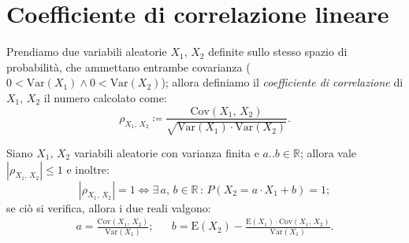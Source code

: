     \section{Coefficiente di correlazione lineare}
        \begin{defn}
            Prendiamo due variabili aleatorie $X_1,\,X_2$ definite sullo stesso spazio di probabilità, che ammettano entrambe covarianza ($0<\text{Var}(X_1) \land 0<\text{Var}(X_2)$); allora definiamo il \textit{coefficiente di correlazione} di $X_1,\,X_2$ il numero calcolato come: \[
            \rho_{X_1,\,X_2} \coloneqq \frac{\text{Cov}(X_1,\,X_2)}{\sqrt{\text{Var}(X_1)\cdot \text{Var}(X_2)}}
            .\] 
        \end{defn}
        \begin{prty}
            Siano $X_1,\,X_2$ variabili aleatorie con varianza finita e $a..b \in \mathbb{R}$; allora vale $|\rho_{X_1,\,X_2}| \leq 1$ e inoltre: \[
                |\rho_{X_1,\,X_2}| = 1 \iff \exists\, a,\,b \in \mathbb{R}\,:\, P(X_2=a\cdot X_1+b) = 1
            ;\] se ciò si verifica, allora i due reali valgono:
            \begin{align*}
                a = \frac{\text{Cov}(X_1,\,X_2)}{\text{Var}(X_1)}; & &
                b = \text{E}(X_2) - \frac{\text{E}(X_1)\cdot \text{Cov}(X_1,\,X_2)}{\text{Var}(X_1)}
            .\end{align*}
        \end{prty}
